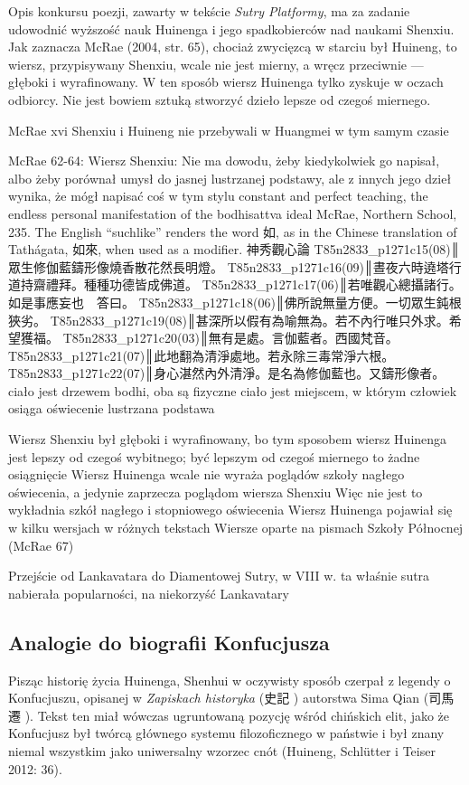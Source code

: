 Opis konkursu poezji, zawarty w tekście \textit{Sutry Platformy}, ma za zadanie udowodnić wyższość nauk Huinenga i jego spadkobierców nad naukami Shenxiu.
Jak zaznacza McRae (2004, str. 65), chociaż zwycięzcą w starciu był Huineng, to wiersz, przypisywany Shenxiu, wcale nie jest mierny, a wręcz przeciwnie --- głęboki i wyrafinowany.
W ten sposób wiersz Huinenga tylko zyskuje w oczach odbiorcy. Nie jest bowiem sztuką stworzyć dzieło lepsze od czegoś miernego.

McRae xvi
Shenxiu i Huineng nie przebywali w Huangmei w tym samym czasie

McRae 62-64:
Wiersz Shenxiu:
Nie ma dowodu, żeby kiedykolwiek go napisał, albo żeby porównał umysł do jasnej lustrzanej podstawy, ale z innych jego dzieł wynika, że mógł napisać coś w tym stylu
constant and perfect teaching, the endless personal manifestation of the
bodhisattva ideal
McRae, Northern School, 235. The English “suchlike'' renders the word 如, as in the Chinese translation of Tathágata, 如來, when used as a modifier.
神秀觀心論
T85n2833_p1271c15(08)║眾生修伽藍鑄形像燒香散花然長明燈。
T85n2833_p1271c16(09)║晝夜六時遶塔行道持齋禮拜。種種功德皆成佛道。
T85n2833_p1271c17(06)║若唯觀心總攝諸行。如是事應妄也　答曰。
T85n2833_p1271c18(06)║佛所說無量方便。一切眾生鈍根狹劣。
T85n2833_p1271c19(08)║甚深所以假有為喻無為。若不內行唯只外求。希望獲福。
T85n2833_p1271c20(03)║無有是處。言伽藍者。西國梵音。
T85n2833_p1271c21(07)║此地翻為清淨處地。若永除三毒常淨六根。
T85n2833_p1271c22(07)║身心湛然內外清淨。是名為修伽藍也。又鑄形像者。
ciało jest drzewem bodhi, oba są fizyczne
ciało jest miejscem, w którym człowiek osiąga oświecenie
lustrzana podstawa

Wiersz Shenxiu był głęboki i wyrafinowany, bo tym sposobem wiersz Huinenga jest lepszy od czegoś wybitnego; być lepszym od czegoś miernego to żadne osiągnięcie
Wiersz Huinenga wcale nie wyraża poglądów szkoły nagłego oświecenia, a jedynie zaprzecza poglądom wiersza Shenxiu
Więc nie jest to wykładnia szkół nagłego i stopniowego oświecenia
Wiersz Huinenga pojawiał się w kilku wersjach w różnych tekstach
Wiersze oparte na pismach Szkoły Północnej (McRae 67)

Przejście od Lankavatara do Diamentowej Sutry, w VIII w. ta właśnie sutra nabierała popularności, na niekorzyść Lankavatary
\fi
\subsection{Analogie do biografii Konfucjusza}
Pisząc historię życia Huinenga, Shenhui w oczywisty sposób czerpał z legendy o Konfucjuszu, opisanej w \textit{Zapiskach historyka} (史記 ) autorstwa Sima Qian (司馬遷 ). Tekst ten miał wówczas ugruntowaną pozycję wśród chińskich elit, jako że Konfucjusz był twórcą głównego systemu filozoficznego w państwie i był znany niemal wszystkim jako uniwersalny wzorzec cnót (Huineng, Schlütter i Teiser 2012: 36).

